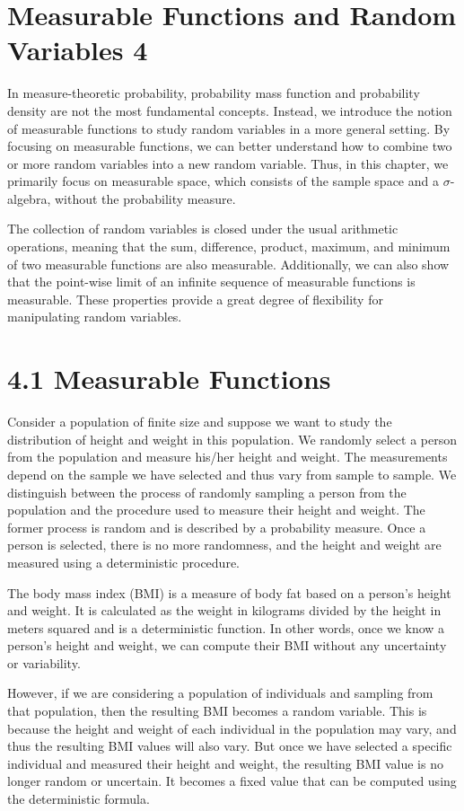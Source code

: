 \section*{Measurable Functions and Random Variables \hfill 4}

In measure-theoretic probability, probability mass function and probability density are not the most fundamental concepts. Instead, we introduce the notion of measurable functions to study random variables in a more general setting. By focusing on measurable functions, we can better understand how to combine two or more random variables into a new random variable. Thus, in this chapter, we primarily focus on measurable space, which consists of the sample space and a $\sigma$-algebra, without the probability measure.

The collection of random variables is closed under the usual arithmetic operations, meaning that the sum, difference, product, maximum, and minimum of two measurable functions are also measurable. Additionally, we can also show that the point-wise limit of an infinite sequence of measurable functions is measurable. These properties provide a great degree of flexibility for manipulating random variables.

\section*{4.1 Measurable Functions}

Consider a population of finite size and suppose we want to study the distribution of height and weight in this population. We randomly select a person from the population and measure his/her height and weight. The measurements depend on the sample we have selected and thus vary from sample to sample. We distinguish between the process of randomly sampling a person from the population and the procedure used to measure their height and weight. The former process is random and is described by a probability measure. Once a person is selected, there is no more randomness, and the height and weight are measured using a deterministic procedure.

The body mass index (BMI) is a measure of body fat based on a person's height and weight. It is calculated as the weight in kilograms divided by the height in meters squared and is a deterministic function. In other words, once we know a person's height and weight, we can compute their BMI without any uncertainty or variability.

However, if we are considering a population of individuals and sampling from that population, then the resulting BMI becomes a random variable. This is because the height and weight of each individual in the population may vary, and thus the resulting BMI values will also vary. But once we have selected a specific individual and measured their height and weight, the resulting BMI value is no longer random or uncertain. It becomes a fixed value that can be computed using the deterministic formula.

